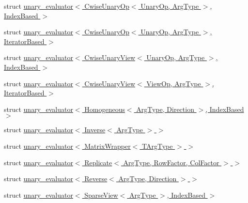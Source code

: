 \begin{DoxyCompactItemize}
\item 
struct \hyperlink{struct_eigen_1_1internal_1_1unary__evaluator_3_01_cwise_unary_op_3_01_unary_op_00_01_arg_type_01_4_00_01_index_based_01_4}{unary\+\_\+evaluator$<$ Cwise\+Unary\+Op$<$ Unary\+Op, Arg\+Type $>$, Index\+Based $>$}
\item 
struct \hyperlink{struct_eigen_1_1internal_1_1unary__evaluator_3_01_cwise_unary_op_3_01_unary_op_00_01_arg_type_01_4_00_01_iterator_based_01_4}{unary\+\_\+evaluator$<$ Cwise\+Unary\+Op$<$ Unary\+Op, Arg\+Type $>$, Iterator\+Based $>$}
\item 
struct \hyperlink{struct_eigen_1_1internal_1_1unary__evaluator_3_01_cwise_unary_view_3_01_unary_op_00_01_arg_type_01_4_00_01_index_based_01_4}{unary\+\_\+evaluator$<$ Cwise\+Unary\+View$<$ Unary\+Op, Arg\+Type $>$, Index\+Based $>$}
\item 
struct \hyperlink{struct_eigen_1_1internal_1_1unary__evaluator_3_01_cwise_unary_view_3_01_view_op_00_01_arg_type_01_4_00_01_iterator_based_01_4}{unary\+\_\+evaluator$<$ Cwise\+Unary\+View$<$ View\+Op, Arg\+Type $>$, Iterator\+Based $>$}
\item 
struct \hyperlink{struct_eigen_1_1internal_1_1unary__evaluator_3_01_homogeneous_3_01_arg_type_00_01_direction_01_4_00_01_index_based_01_4}{unary\+\_\+evaluator$<$ Homogeneous$<$ Arg\+Type, Direction $>$, Index\+Based $>$}
\item 
struct \hyperlink{struct_eigen_1_1internal_1_1unary__evaluator_3_01_inverse_3_01_arg_type_01_4_01_4}{unary\+\_\+evaluator$<$ Inverse$<$ Arg\+Type $>$ $>$}
\item 
struct \hyperlink{struct_eigen_1_1internal_1_1unary__evaluator_3_01_matrix_wrapper_3_01_t_arg_type_01_4_01_4}{unary\+\_\+evaluator$<$ Matrix\+Wrapper$<$ T\+Arg\+Type $>$ $>$}
\item 
struct \hyperlink{struct_eigen_1_1internal_1_1unary__evaluator_3_01_replicate_3_01_arg_type_00_01_row_factor_00_01_col_factor_01_4_01_4}{unary\+\_\+evaluator$<$ Replicate$<$ Arg\+Type, Row\+Factor, Col\+Factor $>$ $>$}
\item 
struct \hyperlink{struct_eigen_1_1internal_1_1unary__evaluator_3_01_reverse_3_01_arg_type_00_01_direction_01_4_01_4}{unary\+\_\+evaluator$<$ Reverse$<$ Arg\+Type, Direction $>$ $>$}
\item 
struct \hyperlink{struct_eigen_1_1internal_1_1unary__evaluator_3_01_sparse_view_3_01_arg_type_01_4_00_01_index_based_01_4}{unary\+\_\+evaluator$<$ Sparse\+View$<$ Arg\+Type $>$, Index\+Based $>$}
\item 

\end{DoxyCompactItemize}
